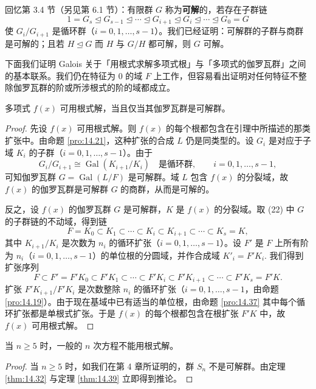 回忆第 3.4 节（另见第 6.1 节）：有限群 \(G\) 称为\textbf{可解}的，若存在子群链
\[
1 = G_s \unlhd G_{s-1} \unlhd \cdots \unlhd G_{i+1} \unlhd G_i \unlhd \cdots \unlhd G_0 = G \tag{14.22}
\]
使 \(G_i/G_{i+1}\) 是循环群（\(i = 0, 1, \ldots, s-1\)）。我们已经证明：可解群的子群与商群是可解的；且若 \(H \unlhd G\) 而 \(H\) 与 \(G/H\) 都可解，则 \(G\) 可解。

下面我们证明 Galois 关于「用根式求解多项式根」与「多项式的伽罗瓦群」之间的基本联系。我们仍在特征为 0 的域 \(F\) 上工作，但容易看出证明对任何特征不整除伽罗瓦群的阶或所涉根式的阶的域都成立。

\begin{theorem}\label{thm:14.39}
多项式 \(f(x)\) 可用根式解，当且仅当其伽罗瓦群是可解群。
\end{theorem}

\begin{proof}
先设 \(f(x)\) 可用根式解。则 \(f(x)\) 的每个根都包含在引理中所描述的那类扩张中。由命题 \ref{pro:14.21}，这种扩张的合成 \(L\) 仍是同类型的。设 \(G_i\) 是对应于子域 \(K_i\) 的子群（\(i = 0, 1, \ldots, s-1\)）。由于
\[
G_i/G_{i+1} \cong \operatorname{Gal}(K_{i+1}/K_i) \quad \text{是循环群},\qquad i = 0, 1, \ldots, s-1,
\]
可知伽罗瓦群 \(G = \operatorname{Gal}(L/F)\) 是可解群。域 \(L\) 包含 \(f(x)\) 的分裂域，故 \(f(x)\) 的伽罗瓦群是可解群 \(G\) 的商群，从而是可解的。

反之，设 \(f(x)\) 的伽罗瓦群 \(G\) 是可解群，\(K\) 是 \(f(x)\) 的分裂域。取 (22) 中 \(G\) 的子群链的不动域，得到链
\[
F = K_0 \subset K_1 \subset \cdots \subset K_i \subset K_{i+1} \subset \cdots \subset K_s = K,
\]
其中 \(K_{i+1}/K_i\) 是次数为 \(n_i\) 的循环扩张（\(i = 0, 1, \ldots, s-1\)）。设 \(F'\) 是 \(F\) 上所有阶为 \(n_i\)（\(i = 0, 1, \ldots, s-1\)）的单位根的分圆域，并作合成域 \(K'_i = F'K_i\). 我们得到扩张序列
\[
F \subset F' = F'K_0 \subset F'K_1 \subset \cdots \subset F'K_i \subset F'K_{i+1} \subset \cdots \subset F'K_s = F'K.
\]
扩张 \(F'K_{i+1}/F'K_i\) 是次数整除 \(n_i\) 的循环扩张（\(i = 0, 1, \ldots, s-1\)，由命题 \ref{pro:14.19}）。由于现在基域中已有适当的单位根，由命题 \ref{pro:14.37} 其中每个循环扩张都是单根式扩张。于是 \(f(x)\) 的每个根都包含在根扩张 \(F'K\) 中，故 \(f(x)\) 可用根式解。
\end{proof}

\begin{corollary}\label{cor:14.40}
当 \(n \geq 5\) 时，一般的 \(n\) 次方程不能用根式解。
\end{corollary}

\begin{proof}
当 \(n \geq 5\) 时，如我们在第 4 章所证明的，群 \(S_n\) 不是可解群。由定理 \ref{thm:14.32} 与定理 \ref{thm:14.39} 立即得到推论。
\end{proof}

